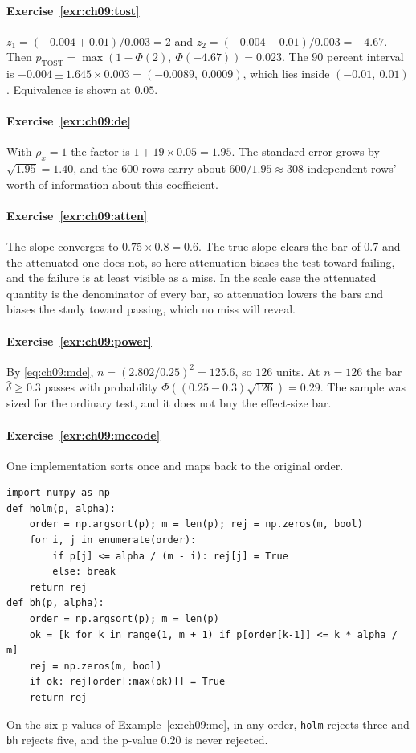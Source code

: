 \paragraph{Exercise~\ref{exr:ch09:tost}}
$z_1=(-0.004+0.01)/0.003=2$ and $z_2=(-0.004-0.01)/0.003=-4.67$. Then $p_{\text{TOST}}=\max(1-\Phi(2),\ \Phi(-4.67))=0.023$. The $90$ percent interval is $-0.004\pm1.645\times0.003=(-0.0089,\ 0.0009)$, which lies inside $(-0.01,\ 0.01)$. Equivalence is shown at $0.05$.

\paragraph{Exercise~\ref{exr:ch09:de}}
With $\rho_x=1$ the factor is $1+19\times0.05=1.95$. The standard error grows by $\sqrt{1.95}=1.40$, and the $600$ rows carry about $600/1.95\approx308$ independent rows' worth of information about this coefficient.

\paragraph{Exercise~\ref{exr:ch09:atten}}
The slope converges to $0.75\times0.8=0.6$. The true slope clears the bar of $0.7$ and the attenuated one does not, so here attenuation biases the test toward failing, and the failure is at least visible as a miss. In the scale case the attenuated quantity is the denominator of every bar, so attenuation lowers the bars and biases the study toward passing, which no miss will reveal.

\paragraph{Exercise~\ref{exr:ch09:power}}
By \eqref{eq:ch09:mde}, $n=(2.802/0.25)^2=125.6$, so $126$ units. At $n=126$ the bar $\hat\delta\ge0.3$ passes with probability $\Phi((0.25-0.3)\sqrt{126})=0.29$. The sample was sized for the ordinary test, and it does not buy the effect-size bar.

\paragraph{Exercise~\ref{exr:ch09:mccode}}
One implementation sorts once and maps back to the original order.
\begin{verbatim}
import numpy as np
def holm(p, alpha):
    order = np.argsort(p); m = len(p); rej = np.zeros(m, bool)
    for i, j in enumerate(order):
        if p[j] <= alpha / (m - i): rej[j] = True
        else: break
    return rej
def bh(p, alpha):
    order = np.argsort(p); m = len(p)
    ok = [k for k in range(1, m + 1) if p[order[k-1]] <= k * alpha / m]
    rej = np.zeros(m, bool)
    if ok: rej[order[:max(ok)]] = True
    return rej
\end{verbatim}
On the six p-values of Example~\ref{ex:ch09:mc}, in any order, \texttt{holm} rejects three and \texttt{bh} rejects five, and the p-value $0.20$ is never rejected.
